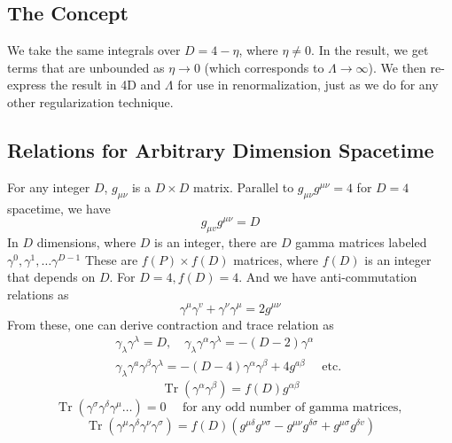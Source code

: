 \subsection{The Concept}
We take the same integrals over $D=4-\eta$, where $\eta\neq0$. In the result, we get terms that are unbounded as $\eta\rightarrow0$ (which corresponds to $\Lambda\rightarrow\infty$). We then re-express the result in 4D and $\Lambda$ for use in renormalization, just as we do for any other regularization technique. 
\subsection{Relations for Arbitrary Dimension Spacetime}
For any integer $D$, $g_{\mu\nu}$ is a $D\times D$ matrix. Parallel to $g_{\mu\nu}g^{\mu\nu}=4$ for $D=4$ spacetime, we have
\begin{equation}g_{\mu v} g^{\mu \nu}=D\end{equation}
In $D$ dimensions, where $D$ is an integer, there are $D$ gamma matrices labeled $\gamma^{0}, \gamma^{1}, \ldots \gamma^{D-1}$ These are $f(P) \times f(D)$ matrices, where $f(D)$ is an integer that depends on $D .$ For $D=4, f(D)=4$. And we have anti-commutation relations as
\begin{equation}\gamma^{\mu} \gamma^{v}+\gamma^{\nu} \gamma^{\mu}=2 g^{\mu \nu}\end{equation}
From these, one can derive contraction and trace relation as
\begin{equation}\begin{array}{l}
\gamma_{\lambda} \gamma^{\lambda}=D, \quad \gamma_{\lambda} \gamma^{\alpha} \gamma^{\lambda}=-(D-2) \gamma^{\alpha} \\
\gamma_{\lambda} \gamma^{a} \gamma^{\beta} \gamma^{\lambda}=-(D-4) \gamma^{\alpha} \gamma^{\beta}+4 g^{a \beta} \quad \text { etc. }
\end{array}
\label{gamma-relation-for-lambda}
\end{equation}
\begin{equation}\operatorname{Tr}\left(\gamma^{\alpha} \gamma^{\beta}\right)=f(D) g^{\alpha \beta}\end{equation}
\begin{equation}\operatorname{Tr}\left(\gamma^{\sigma} \gamma^{\delta} \gamma^{\mu}\dots\right)=0 \quad \text { for any odd number of gamma matrices, }\end{equation}
\begin{equation}\operatorname{Tr}\left(\gamma^{\mu} \gamma^{\delta} \gamma^{\nu} \gamma^{\sigma}\right)=f(D)\left(g^{\mu \delta} g^{\nu \sigma}-g^{\mu \nu} g^{\delta \sigma}+g^{\mu \sigma} g^{\delta v}\right)\end{equation}
